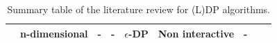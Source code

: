 \begin{landscape}
\begin{table}[ht]
\begin{tabular}{rllllllll}
            \citep{geng_optimal_2013}      & n-dimensional                  & -       & -                                                          & $\epsilon$-DP & Non interactive & -                        \\
            \bottomrule
        \end{tabular}
        \caption{Summary table of the literature review for (L)DP algorithms.}
        \label{tab:summary_table_dp}
    \end{table}

    \begin{table}
        \centering


\end{table}
\end{landscape}
